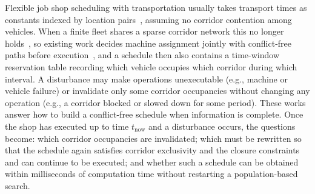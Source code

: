\documentclass[manuscript,screen,review]{acmart}
\begin{document}
Flexible job shop scheduling with transportation usually takes transport times as constants indexed by location pairs~\cite{xin2025review,meng2025cp,qin2026knowledge}, assuming no corridor contention among vehicles.
When a finite fleet shares a sparse corridor network this no longer holds~\cite{kim2026congestion}, so existing work decides machine assignment jointly with conflict-free paths before execution~\cite{vanos2026exact,sun2023integrated,lyu2019approach,li2026framework},
and a schedule then also contains a time-window reservation table recording which vehicle occupies which corridor during which interval.
A disturbance may make operations unexecutable (e.g., machine or vehicle failure) or invalidate only some corridor occupancies without changing any operation (e.g., a corridor blocked or slowed down for some period).
These works answer how to build a conflict-free schedule when information is complete. Once the shop has executed up to time \(t_{\mathrm{now}}\) and a disturbance occurs, the questions become:
which corridor occupancies are invalidated; which must be rewritten so that the schedule again satisfies corridor exclusivity and the closure constraints and can continue to be executed;
and whether such a schedule can be obtained within milliseconds of computation time without restarting a population-based search.
\end{document}

